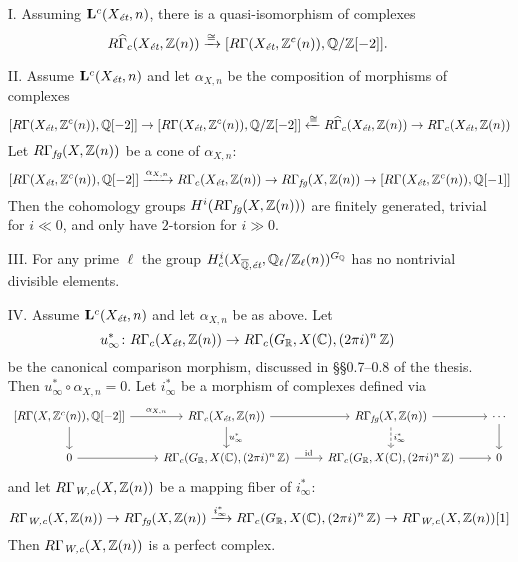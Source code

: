 \documentclass{article}
\begin{document}
\begin{enumerate}
\item[I.] Assuming $\mathbf{L}^c (X_\text{\it ét}, n)$, there is a
  quasi-isomorphism of complexes
  $$R\widehat{\Gamma}_c (X_\text{\it ét}, \mathbb{Z} (n)) \xrightarrow{\cong}
[R\Gamma (X_\text{\it ét}, \mathbb{Z}^c (n)), \mathbb{Q}/\mathbb{Z} [-2]].$$

\item[II.] Assume $\mathbf{L}^c (X_\text{\it ét}, n)$ and let $\alpha_{X,n}$ be
  the composition of morphisms of complexes
  \[
    [R\Gamma (X_\text{\it ét}, \mathbb{Z}^c (n)), \mathbb{Q} [-2]] \to
    [R\Gamma (X_\text{\it ét}, \mathbb{Z}^c (n)), \mathbb{Q}/\mathbb{Z}[-2]] \xleftarrow{\cong}
    R\widehat{\Gamma}_c (X_\text{\it ét}, \mathbb{Z} (n)) \to
    R\Gamma_c (X_\text{\it ét}, \mathbb{Z} (n))
  \]
  Let $R\Gamma_\text{\it fg} (X, \mathbb{Z} (n))$ be a cone of $\alpha_{X,n}$:
  \[
    [R\Gamma (X_\text{\it ét}, \mathbb{Z}^c (n)), \mathbb{Q} [-2]] \xrightarrow{\alpha_{X,n}}
    R\Gamma_c (X_\text{\it ét}, \mathbb{Z} (n)) \to
    R\Gamma_\text{\it fg} (X, \mathbb{Z} (n)) \to
    [R\Gamma (X_\text{\it ét}, \mathbb{Z}^c (n)), \mathbb{Q} [-1]]
  \]
  Then the cohomology groups $H^i (R\Gamma_\text{\it fg} (X, \mathbb{Z} (n)))$ are
  finitely generated, trivial for $i \ll 0$, and only have $2$-torsion for
  $i \gg 0$.

\item[III.] For any prime $\ell$ the group
  $H^i_c (X_{\overline{\mathbb{Q}},\text{\it ét}}, \mathbb{Q}_\ell/\mathbb{Z}_\ell (n))^{G_{\mathbb{Q}}}$
  has no nontrivial divisible elements.

\item[IV.] Assume $\mathbf{L}^c (X_\text{\it ét}, n)$ and let $\alpha_{X,n}$ be
  as above. Let
  \[ u_\infty^*\colon R\Gamma_c (X_\text{\it ét}, \mathbb{Z} (n)) \to
    R\Gamma_c (G_{\mathbb{R}}, X (\mathbb{C}), (2\pi i)^n\,\mathbb{Z}) \]
  be the canonical comparison morphism, discussed in \S\S 0.7--0.8 of the
  thesis. Then $u_\infty^*\circ \alpha_{X,n} = 0$. Let $i_\infty^*$ be a morphism
  of complexes defined via
  \[ \begin{tikzcd}
      {[R\Gamma (X, \ZZ^c (n)), \QQ [-2]]} \ar{r}{\alpha_{X,n}}\ar{d} & R\Gamma_c (X_\text{\it ét}, \ZZ (n)) \ar{d}{u_\infty^*}\ar{r} & R\Gamma_\text{\it fg} (X, \ZZ (n)) \ar[dashed]{d}{i_\infty^*}\ar{r} & \cdots\ar{d} \\
      0\ar{r} & R\Gamma_c (G_\RR, X (\CC), (2\pi i)^n\,\ZZ) \ar{r}{\idid} & R\Gamma_c (G_\RR, X (\CC), (2\pi i)^n\,\ZZ) \ar{r} & 0
    \end{tikzcd} \]
  and let $R\Gamma_\text{\it W,c} (X,\mathbb{Z}(n))$ be a mapping fiber of
  $i_\infty^*$:
  \[
    R\Gamma_\text{\it W,c} (X,\mathbb{Z}(n)) \to
    R\Gamma_\text{\it fg} (X, \mathbb{Z} (n)) \xrightarrow{i_\infty^*}
    R\Gamma_c (G_{\mathbb{R}}, X (\mathbb{C}), (2\pi i)^n\,\mathbb{Z}) \to
    R\Gamma_\text{\it W,c} (X,\mathbb{Z}(n)) [1]
  \]
  Then $R\Gamma_\text{\it W,c} (X,\mathbb{Z}(n))$ is a perfect complex.
\end{enumerate}
\end{document}
